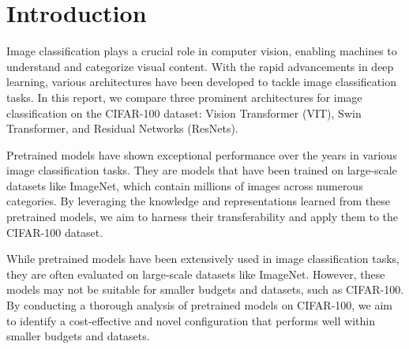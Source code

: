 \documentclass{article}
\begin{document}
\section{Introduction}
Image classification plays a crucial role in computer vision, enabling machines to understand and categorize visual content. 
With the rapid advancements in deep learning, various architectures have been developed to tackle image classification tasks. 
In this report, we compare three prominent architectures for image classification on the CIFAR-100 dataset: Vision Transformer (VIT), Swin Transformer, and Residual Networks (ResNets).




Pretrained models have shown exceptional performance over the years in various image classification tasks. They are models that have been trained on large-scale datasets like ImageNet, which contain millions of images across numerous categories.
By leveraging the knowledge and representations learned from these pretrained models, we aim to harness their transferability and apply them to the CIFAR-100 dataset.



While pretrained models have been extensively used in image classification tasks, they are often evaluated on large-scale datasets like ImageNet. However, these models may not be suitable for smaller budgets and datasets, such as CIFAR-100. By conducting a thorough analysis of pretrained models on CIFAR-100, we aim to identify a cost-effective and novel configuration that performs well within smaller budgets and datasets.
\end{document}
